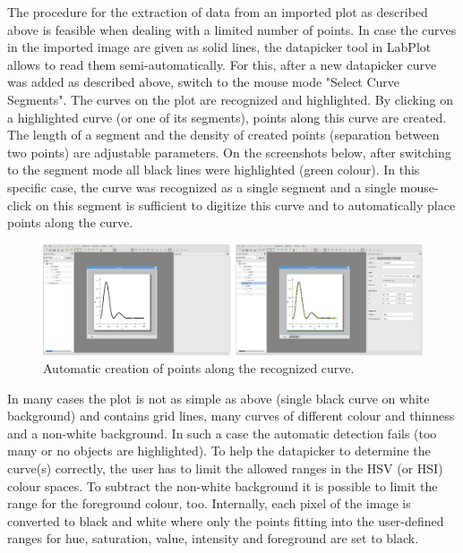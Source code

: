 The procedure for the extraction of data from an imported plot as described above is feasible when dealing with a limited number of points.
In case the curves in the imported image are given as solid lines, the datapicker tool in LabPlot allows to read them semi-automatically.
For this, after a new datapicker curve was added as described above, switch to the mouse mode "Select Curve Segments". The curves on the plot are recognized and highlighted.
By clicking on a highlighted curve (or one of its segments), points along this curve are created.
The length of a segment and the density of created points (separation between two points) are adjustable parameters.
On the screenshots below, after switching to the segment mode all black lines were highlighted (green colour).
In this specific case, the curve was recognized as a single segment and a single mouse-click on this segment is sufficient to digitize this curve and to automatically place points along the curve.
\begin{figure}
\includegraphics[width=\textwidth]{images/datapicker_segments.png}
\caption{Automatic creation of points along the recognized curve.}
\end{figure}

In many cases the plot is not as simple as above (single black curve on white background) and contains grid lines, many curves of different colour and thinness and a non-white background.
In such a case the automatic detection fails (too many or no objects are highlighted). To help the datapicker to determine the curve(s) correctly, the user has to limit the allowed ranges in the HSV (or HSI) colour spaces.
To subtract the non-white background it is possible to limit the range for the foreground colour, too.
Internally, each pixel of the image is converted to black and white where only the points fitting into the user-defined ranges for hue, saturation, value, intensity and foreground are set to black.

